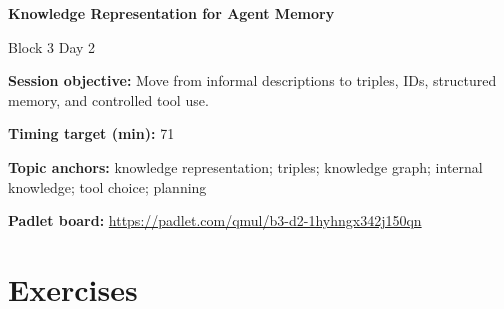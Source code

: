 \documentclass[11pt]{article}
\begin{document}
\begin{center}\LARGE\bfseries Knowledge Representation for Agent Memory\end{center}

\begin{center}\large Block 3 Day 2\end{center}

\begin{tcolorbox}[colback=MidnightBlue!4,colframe=MidnightBlue,title={Session Overview},fonttitle=\bfseries,breakable]
\textbf{Session objective:} Move from informal descriptions to triples, IDs, structured memory, and controlled tool use.

\textbf{Timing target (min):} 71

\textbf{Topic anchors:} knowledge representation; triples; knowledge graph; internal knowledge; tool choice; planning

\textbf{Padlet board:} \url{https://padlet.com/qmul/b3-d2-1hyhngx342j150qn}
\end{tcolorbox}

\section*{Exercises}
\end{document}

